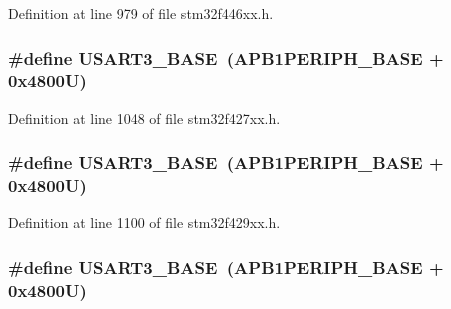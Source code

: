 Definition at line 979 of file stm32f446xx.\+h.

\subsubsection[{\texorpdfstring{U\+S\+A\+R\+T3\+\_\+\+B\+A\+SE}{USART3_BASE}}]{\setlength{\rightskip}{0pt plus 5cm}\#define U\+S\+A\+R\+T3\+\_\+\+B\+A\+SE~({\bf A\+P\+B1\+P\+E\+R\+I\+P\+H\+\_\+\+B\+A\+SE} + 0x4800\+U)}\hypertarget{group___peripheral__memory__map_gabe0d6539ac0026d598274ee7f45b0251}{}\label{group___peripheral__memory__map_gabe0d6539ac0026d598274ee7f45b0251}


Definition at line 1048 of file stm32f427xx.\+h.

\subsubsection[{\texorpdfstring{U\+S\+A\+R\+T3\+\_\+\+B\+A\+SE}{USART3_BASE}}]{\setlength{\rightskip}{0pt plus 5cm}\#define U\+S\+A\+R\+T3\+\_\+\+B\+A\+SE~({\bf A\+P\+B1\+P\+E\+R\+I\+P\+H\+\_\+\+B\+A\+SE} + 0x4800\+U)}\hypertarget{group___peripheral__memory__map_gabe0d6539ac0026d598274ee7f45b0251}{}\label{group___peripheral__memory__map_gabe0d6539ac0026d598274ee7f45b0251}


Definition at line 1100 of file stm32f429xx.\+h.

\subsubsection[{\texorpdfstring{U\+S\+A\+R\+T3\+\_\+\+B\+A\+SE}{USART3_BASE}}]{\setlength{\rightskip}{0pt plus 5cm}\#define U\+S\+A\+R\+T3\+\_\+\+B\+A\+SE~({\bf A\+P\+B1\+P\+E\+R\+I\+P\+H\+\_\+\+B\+A\+SE} + 0x4800\+U)}\hypertarget{group___peripheral__memory__map_gabe0d6539ac0026d598274ee7f45b0251}{}\label{group___peripheral__memory__map_gabe0d6539ac0026d598274ee7f45b0251}


